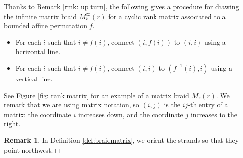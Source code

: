 \documentclass[10pt]{amsart}
\theoremstyle{plain}
\theoremstyle{definition}
\newtheorem{remark}[thm]{Remark}
\theoremstyle{remark}
\numberwithin{equation}{section}
\begin{document}
Thanks to Remark \ref{rmk: up turn}, the following gives a procedure for drawing the infinite matrix braid $M_{k}^{\infty}(r)$ for a cyclic rank matrix associated to a bounded affine permutation $f$. 

\begin{itemize}
    \item[-] For each $i$ such that $i \neq f(i)$, connect $(i, f(i))$ to $(i, i)$ using a horizontal line.
    \item[-] For each $i$ such that $i \neq f(i)$, connect $(i,i)$ to $(f^{-1}(i), i)$ using a vertical line. 
\end{itemize}

See Figure \ref{fig: rank matrix} for an example of a matrix braid $M_k(r)$. We remark that we are using matrix notation, so $(i,j)$ is the $ij$-th entry of a matrix: the coordinate $i$ increases down, and the coordinate $j$ increases to the right. 

\begin{remark}
In Definition \ref{def:braidmatrix}, we orient the strands so that they point northwest.\hfill$\Box$
\end{remark}
\end{document}
